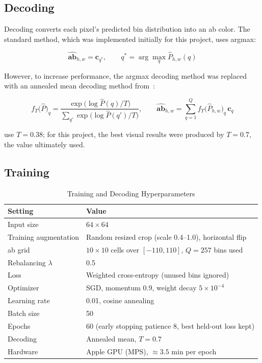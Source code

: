 \documentclass{article}
\begin{document}
\subsection{Decoding}

Decoding converts each pixel's predicted bin distribution into an ab color. The standard method, which was implemented initially for this project, uses argmax:

\begin{equation}
\hat{\mathbf{ab}}_{h,w} = \mathbf{c}_{q^*}, \qquad q^* = \arg\max_q \hat{P}_{h,w}(q)
\label{eq:argmax}
\end{equation}

\noindent However, to increase performance, the argmax decoding method was replaced with an annealed mean decoding method from~\citet{zhang2016colorful}:

\begin{equation}
f_T\big(\hat{P}\big)_q = \frac{\exp\big(\log \hat{P}(q) / T\big)}{\sum_{q'} \exp\big(\log \hat{P}(q') / T\big)},
\qquad
\hat{\mathbf{ab}}_{h,w} = \sum_{q=1}^{Q} f_T\big(\hat{P}_{h,w}\big)_q\, \mathbf{c}_q
\label{eq:annealed}
\end{equation}

\noindent \citet{zhang2016colorful} use $T=0.38$; for this project, the best visual results were produced by $T=0.7$, the value ultimately used.

\subsection{Training}

\begin{table}[htbp]
\centering
\begin{tabular}{ll}
\toprule
Setting & Value \\
\midrule
Input size & $64 \times 64$ \\
Training augmentation & Random resized crop (scale 0.4--1.0), horizontal flip \\
ab grid & $10 \times 10$ cells over $[-110, 110]$, $Q = 257$ bins used \\
Rebalancing $\lambda$ & 0.5 \\
Loss & Weighted cross-entropy (unused bins ignored) \\
Optimizer & SGD, momentum 0.9, weight decay $5 \times 10^{-4}$ \\
Learning rate & 0.01, cosine annealing \\
Batch size & 50 \\
Epochs & 60 (early stopping patience 8, best held-out loss kept) \\
Decoding & Annealed mean, $T = 0.7$ \\
Hardware & Apple GPU (MPS), $\approx 3.5$ min per epoch \\
\bottomrule
\end{tabular}
\caption{Training and Decoding Hyperparameters}
\label{tab:hyperparameters}
\end{table}
\end{document}
